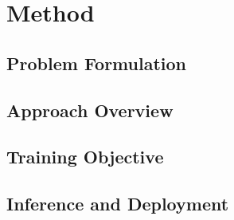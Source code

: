 \section{Method}

\subsection{Problem Formulation}

\subsection{Approach Overview}

\subsection{Training Objective}

\subsection{Inference and Deployment}

